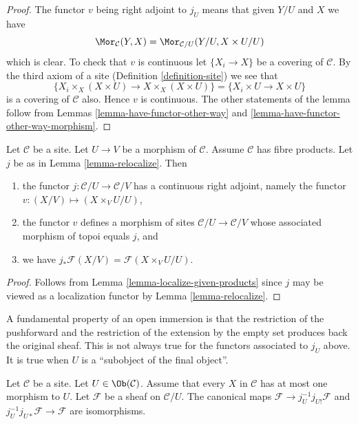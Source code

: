 \begin{proof}
The functor $v$ being right adjoint to $j_U$ means that given $Y/U$ and $X$
we have
$$
\Mor_\mathcal{C}(Y, X)
=
\Mor_{\mathcal{C}/U}(Y/U, X \times U/U)
$$
which is clear. To check that $v$ is continuous let $\{X_i \to X\}$ be
a covering of $\mathcal{C}$. By the third axiom of a site
(Definition \ref{definition-site})
we see that
$$
\{X_i \times_X (X \times U) \to X \times_X (X \times U)\}
=
\{X_i \times U \to X \times U\}
$$
is a covering of $\mathcal{C}$ also. Hence $v$ is continuous. The other
statements of the lemma follow from Lemmas \ref{lemma-have-functor-other-way}
and \ref{lemma-have-functor-other-way-morphism}.
\end{proof}

\begin{lemma}
\label{lemma-relocalize-given-fibre-products}
Let $\mathcal{C}$ be a site. Let $U \to V$ be a morphism of $\mathcal{C}$.
Assume $\mathcal{C}$ has fibre products. Let $j$ be as in
Lemma \ref{lemma-relocalize}. Then
\begin{enumerate}
\item the functor $j : \mathcal{C}/U \to \mathcal{C}/V$
has a continuous right adjoint, namely the functor
$v : (X/V) \mapsto (X \times_V U/U)$,
\item the functor $v$ defines a morphism of sites
$\mathcal{C}/U \to \mathcal{C}/V$ whose associated morphism of topoi equals
$j$, and
\item we have $j_*\mathcal{F}(X/V) = \mathcal{F}(X \times_V U/U)$.
\end{enumerate}
\end{lemma}

\begin{proof}
Follows from Lemma \ref{lemma-localize-given-products} since $j$ may be viewed
as a localization functor by Lemma \ref{lemma-relocalize}.
\end{proof}

\noindent
A fundamental property of an open immersion is
that the restriction of the pushforward and the restriction
of the extension by the empty set produces back the original sheaf.
This is not always true for the functors associated to $j_U$
above. It is true when $U$ is a ``subobject of the final object''.

\begin{lemma}
\label{lemma-restrict-back}
Let $\mathcal{C}$ be a site.
Let $U \in \Ob(\mathcal{C})$.
Assume that every $X$ in $\mathcal{C}$ has at most
one morphism to $U$. Let $\mathcal{F}$ be a sheaf on $\mathcal{C}/U$.
The canonical maps $\mathcal{F} \to j_U^{-1}j_{U!}\mathcal{F}$
and $j_U^{-1}j_{U*}\mathcal{F} \to \mathcal{F}$ are
isomorphisms.
\end{lemma}

